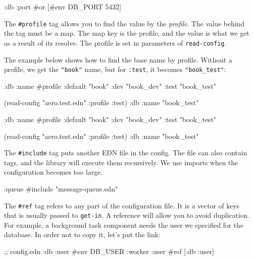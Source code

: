 \begin{clojure}
{:db {:port #or [#env DB_PORT 5432]}}
\end{clojure}


The \verb|#profile| tag allows you to find the value by the \emph{profile}. The value behind the tag must be a map. The map key is the profile, and the value is what we get as a result of its resolve. The profile is set in parameters of \verb|read-config|.

The example below shows how to find the base name by profile. Without a profile, we get the \verb|"book"| name, but for \verb|:test|, it becomes \verb|"book_test"|:

\ifx\DEVICETYPE\MOBILE

\begin{clojure}
{:db
 {:name
  #profile {:default "book"
            :dev     "book_dev"
            :test    "book_test"}}}

(read-config "aero.test.edn"
  {:profile :test})
{:db {:name "book_test"}}
\end{clojure}

\else

\begin{clojure}
{:db {:name #profile {:default "book"
                      :dev     "book_dev"
                      :test    "book_test"}}}

(read-config "aero.test.edn" {:profile :test})
{:db {:name "book_test"}}
\end{clojure}

\fi

The \verb|#include| tag puts another EDN file in the config. The file can also contain tags, and the library will execute them recursively. We use imports when the configuration becomes too large.

\begin{clojure}
{:queue #include "message-queue.edn"}
\end{clojure}

The \verb|#ref| tag refers to any part of the configuration file. It is a vector of keys that is usually passed to \verb|get-in|. A reference will allow you to avoid duplication. For example, a background task component needs the user we specified for the database. In order not to copy it, let's put the link:

\begin{clojure}
;; config.edn
{:db {:user #env DB_USER}
 :worker {:user #ref [:db :user]}}
\end{clojure}

